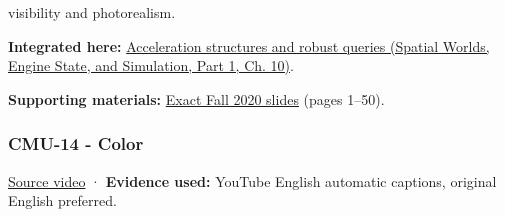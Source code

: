 visibility and photorealism.

\textbf{Integrated here:} \href{../05-Spatial-Worlds-Engine-State-and-Simulation-P01/main.pdf\#04-visual-computing-ii-ch029-acceleration-structures-and-robust-queries-1}{Acceleration structures and robust queries (Spatial Worlds, Engine State, and Simulation, Part 1, Ch. 10)}.

\textbf{Supporting materials:} \href{https://15462.courses.cs.cmu.edu/fall2020content/lectures/13_spatialdatastructures/13_spatialdatastructures_slides.pdf}{Exact Fall 2020 slides} (pages 1--50).

\subsubsection{CMU-14 - Color}\label{04-visual-computing-ii-ch036-cmu-14---color}

\hypertarget{04-visual-computing-ii-ch036-cmu-14---color}{}

\href{https://www.youtube.com/watch?v=77WBg0Mprt0}{Source video} · \textbf{Evidence used:} YouTube English automatic captions, original English preferred.

